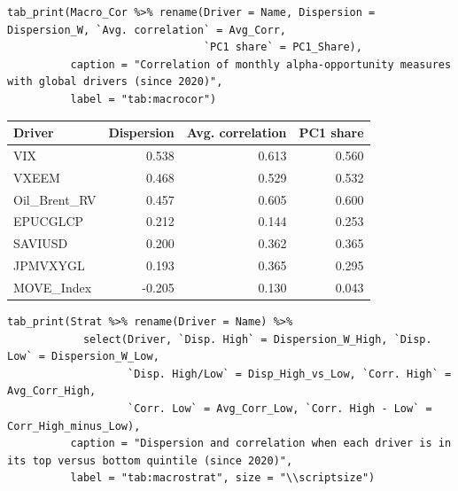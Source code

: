 \documentclass[11pt,preprint]{elsarticle}
\let\origtable\table
\let\endorigtable\endtable
\renewenvironment{table}[1][2] {
    \expandafter\origtable\expandafter[H]
} {
    \endorigtable
}
\numberwithin{equation}{section}
\numberwithin{figure}{section}
\numberwithin{table}{section}
\begin{document}
\begin{verbatim}
tab_print(Macro_Cor %>% rename(Driver = Name, Dispersion = Dispersion_W, `Avg. correlation` = Avg_Corr,
                               `PC1 share` = PC1_Share),
          caption = "Correlation of monthly alpha-opportunity measures with global drivers (since 2020)",
          label = "tab:macrocor")
\end{verbatim}

\begin{table}[!htbp]
\centering
\caption{Correlation of monthly alpha-opportunity measures with global drivers (since 2020)} 
\label{tab:macrocor}
\begingroup\footnotesize
\begin{tabular}{lrrr}
  \hline
Driver & Dispersion & Avg. correlation & PC1 share \\ 
  \hline
VIX & 0.538 & 0.613 & 0.560 \\ 
  VXEEM & 0.468 & 0.529 & 0.532 \\ 
  Oil\_Brent\_RV & 0.457 & 0.605 & 0.600 \\ 
  EPUCGLCP & 0.212 & 0.144 & 0.253 \\ 
  SAVIUSD & 0.200 & 0.362 & 0.365 \\ 
  JPMVXYGL & 0.193 & 0.365 & 0.295 \\ 
  MOVE\_Index & -0.205 & 0.130 & 0.043 \\ 
   \hline
\end{tabular}
\endgroup
\end{table}

\begin{verbatim}
tab_print(Strat %>% rename(Driver = Name) %>%
            select(Driver, `Disp. High` = Dispersion_W_High, `Disp. Low` = Dispersion_W_Low,
                   `Disp. High/Low` = Disp_High_vs_Low, `Corr. High` = Avg_Corr_High,
                   `Corr. Low` = Avg_Corr_Low, `Corr. High - Low` = Corr_High_minus_Low),
          caption = "Dispersion and correlation when each driver is in its top versus bottom quintile (since 2020)",
          label = "tab:macrostrat", size = "\\scriptsize")
\end{verbatim}
\end{document}
